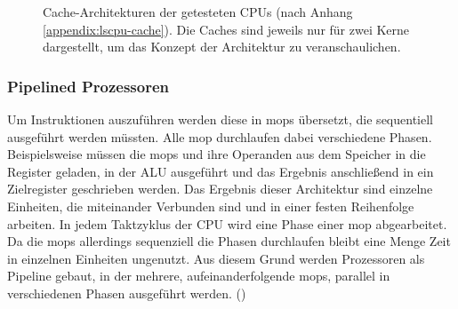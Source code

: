 \begin{figure}
\begin{subfigure}{0.3\textwidth}
    \end{subfigure}
    \begin{subfigure}{0.3\textwidth}
        \centering
    \end{subfigure}
    \caption{Cache-Architekturen der getesteten \acp{CPU} (nach Anhang
    \ref{appendix:lscpu-cache})\label{figure:cache-architectures}.
    Die Caches sind jeweils nur für zwei Kerne dargestellt, um das
    Konzept der Architektur zu veranschaulichen.}
\end{figure}

\subsubsection{Pipelined Prozessoren}
Um Instruktionen auszuführen werden diese in \acp{mop}
übersetzt, die sequentiell ausgeführt werden müssten.
Alle \ac{mop} durchlaufen dabei verschiedene
Phasen. Beispielsweise müssen die \acp{mop} und ihre Operanden aus
dem Speicher in die Register geladen, in der ALU
ausgeführt und das Ergebnis anschließend in ein Zielregister geschrieben
werden. Das Ergebnis dieser Architektur
sind einzelne Einheiten, die miteinander Verbunden sind und in
einer festen Reihenfolge arbeiten. In jedem Taktzyklus
der \ac{CPU} wird eine Phase einer \ac{mop}
abgearbeitet. Da die \acp{mop} allerdings sequenziell die
Phasen durchlaufen bleibt eine Menge Zeit in einzelnen
Einheiten ungenutzt. Aus diesem Grund werden Prozessoren als
Pipeline gebaut, in der mehrere, aufeinanderfolgende \acp{mop},
parallel in verschiedenen Phasen ausgeführt werden.
(\cite[361,362]{sarangi_basic_2021})

